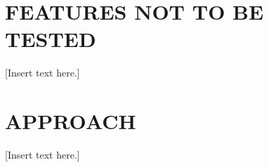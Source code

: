 \documentclass[twoside,letterpaper]{article}
\begin{document}
\bigskip

\subsection[]{\bfseries }

\bigskip

\subsection[]{\bfseries }

\bigskip





\section[FEATURES NOT TO BE TESTED]{\bfseries
FEATURES NOT TO BE TESTED}

[Insert text here.]


\section[APPROACH]{\bfseries APPROACH}

[Insert text here.]
\end{document}
